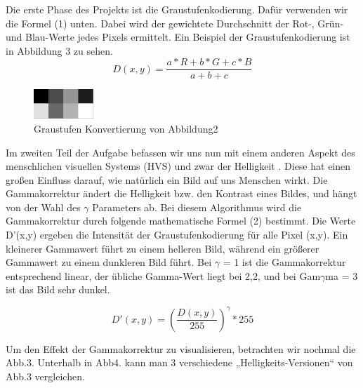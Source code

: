 \documentclass[course=erap]{aspdoc}
\begin{document}
\par
Die erste Phase des Projekts ist die Graustufenkodierung. Dafür verwenden wir die Formel (1) unten. Dabei wird der gewichtete Durchschnitt der Rot-, Grün- und Blau-Werte jedes Pixels ermittelt. Ein Beispiel der Graustufenkodierung ist in Abbildung 3 zu sehen. 
\begin{equation}
D(x,y)=\frac{a*R+b*G+c*B}{a+b+c}
\end{equation}


\begin{figure}[h]
\centering
\includegraphics[width=0.2\textwidth]{Bilder/gamma1.pgm.png}
\caption{Graustufen Konvertierung von Abbildung2}
\end{figure}

\par
Im zweiten Teil der Aufgabe befassen wir uns nun mit einem anderen Aspekt des menschlichen visuellen Systems (HVS) und zwar der Helligkeit \cite{westin2011gammacorrection}. Diese hat einen großen Einfluss darauf, wie natürlich ein Bild auf uns Menschen wirkt. Die Gammakorrektur ändert die Helligkeit bzw. den Kontrast eines Bildes, und hängt von der Wahl des $ \gamma $ Parameters ab. Bei diesem Algorithmus wird die Gammakorrektur durch folgende mathematische Formel (2) bestimmt. Die Werte D'(x,y) ergeben die Intensität der Graustufenkodierung für alle Pixel (x,y). Ein kleinerer Gammawert führt zu einem helleren Bild, während ein größerer Gammawert zu einem dunkleren Bild führt. Bei $\gamma$ = 1 ist die Gammakorrektur entsprechend linear, der übliche Gamma-Wert liegt bei 2,2, und bei Gam$\gamma$ma = 3 ist das Bild sehr dunkel.\cite{cambridgeincolor2020gammacorrection}

\begin{equation}
D'(x,y)={\left( \frac{D(x,y)}{255} \right)}^{\gamma}*255
\end{equation}

\par
Um den Effekt der Gammakorrektur zu visualisieren, betrachten wir nochmal die Abb.3. Unterhalb in Abb4. kann man 3 verschiedene „Helligkeits-Versionen“ von Abb.3 vergleichen.
\end{document}
